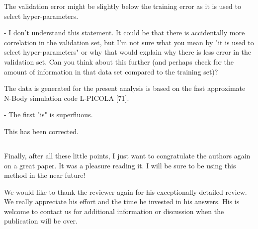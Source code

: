 \documentclass[12pt,a4paper]{article}
\newcommand{\nati}[1]{{\color[rgb]{.1,.6,.1}{NP: #1}}}
\newcommand{\1}{\b{1}}              %
\newcommand{\0}{\b{0}}              %
\begin{document}
\begin{mdframed}[style=comment] 
The validation error might be slightly below the training error as it is used to select hyper-parameters.

- I don't understand this statement. It could be that there is accidentally more correlation in the validation set, but I'm not sure what you mean by "it is used to select hyper-parameters" or why that would explain why there is less error in the validation set. Can you think about this further (and perhaps check for the amount of information in that data set compared to the training set)?
\end{mdframed}
\nati{
We changed the sentence as:
\begin{mdframed}[style=manuscript] 
The validation error might be slightly below the training error as the validation set is used to select hyper-parameters.
\end{mdframed}
For linear SVM, there is one hyper-parameter to tune. As we select the hyperparameter with the lowest validation error, it is possible that the validation error is lower than the training error.}

\begin{mdframed}[style=comment] 
The data is generated for the present analysis is based on the fast approximate N-Body simulation code L-PICOLA [71].

- The first "is" is superfluous.
\end{mdframed}
This has been corrected.

\subsection{}

\begin{mdframed}[style=comment] 

Finally, after all these little points, I just want to congratulate the authors again on a great paper. It was a pleasure reading it. I will be sure to be using this method in the near future!
\end{mdframed}
We would like to thank the reviewer again for his exceptionally detailed review. We really appreciate his effort and the time he invested in his answers. His is welcome to contact us for additional information or discussion when the publication will be over.



\clearpage
\newpage



\end{document}
